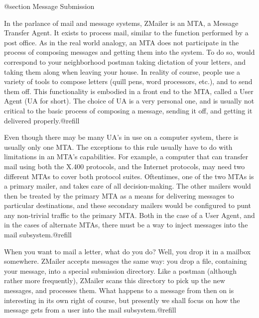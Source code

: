 @section Message Submission

In the parlance of mail and message systems, ZMailer is an MTA, a
Message Transfer Agent. It exists to process mail, similar to the
function performed by a post office. As in the real world analogy, an
MTA does not participate in the process of composing messages and
getting them into the system. To do so, would correspond to your
neighborhood postman taking dictation of your letters, and taking them
along when leaving your house. In reality of course, people use a
variety of tools to compose letters (quill pens, word processors,
etc.), and to send them off.  This functionality is embodied in a front
end to the MTA, called a User Agent (UA for short). The choice of UA is
a very personal one, and is usually not critical to the basic process
of composing a message, sending it off, and getting it delivered
properly.@refill

Even though there may be many UA's in use on a computer system, there
is usually only one MTA. The exceptions to this rule usually have to do
with limitations in an MTA's capabilities. For example, a computer that
can transfer mail using both the X.400 protocols, and the Internet
protocols, may need two different MTAs to cover both protocol suites.
Oftentimes, one of the two MTAs is a primary mailer, and takes care of
all decision-making. The other mailers would then be treated by the
primary MTA as a means for delivering messages to particular
destinations, and these secondary mailers would be configured to punt
any non-trivial traffic to the primary MTA.  Both in the case of a User
Agent, and in the cases of alternate MTAs, there must be a way to
inject messages into the mail subsystem.@refill

When you want to mail a letter, what do you do? Well, you drop it in a
mailbox somewhere. ZMailer accepts messages the same way: you drop a
file, containing your message, into a special submission directory.
Like a postman (although rather more frequently), ZMailer scans this
directory to pick up the new messages, and processes them.  What
happens to a message from then on is interesting in its own right of
course, but presently we shall focus on how the message gets from a
user into the mail subsystem.@refill

